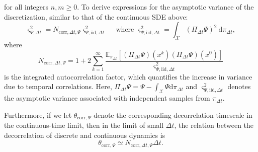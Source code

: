\documentclass[11pt, twoside]{report}
\newtheorem{assumption}[theorem]{Assumption}
\begin{document}
for all integers $n,m \geq 0$. To derive expressions for the asymptotic variance of the discretization, similar to that of the continuous SDE above:
\begin{equation}
\varsigma_{\Psi, \Delta t}^2=N_{\mathrm{corr}, \Delta t, \Psi} \varsigma_{\Psi, \mathrm{iid}, \Delta t}^2 \quad \text { where } \varsigma_{\Psi, \mathrm{iid}, \Delta t}^2=\int_{\mathcal{X}}\left(\Pi_{\Delta t} \Psi\right)^2 \mathrm{~d} \pi_{\Delta t},
\end{equation}
where
\[
N_{\mathrm{corr},\Delta t,\Psi}
=
1+2\sum_{k=1}^{\infty}
\frac{
\mathbb E_{\pi_{\Delta t}}
\!\left[
(\Pi_{\Delta t}\Psi)(x^k)
(\Pi_{\Delta t}\Psi)(x^0)
\right]
}{
\varsigma_{\Psi,\mathrm{iid},\Delta t}^{2}
}
\]
is the integrated autocorrelation factor, which quantifies the increase in variance due to temporal correlations. Here, $\Pi_{\Delta t} \Psi=\Psi-\int_{\mathcal{X}} \Psi \mathrm{d} \pi_{\Delta t}$ and $\varsigma_{\Psi,\mathrm{iid},\Delta t}^{2}$ denotes the asymptotic variance associated with independent samples from $\pi_{\Delta t}$.

Furthermore, if we let $\theta_{\mathrm{corr},\Psi}$ denote the corresponding decorrelation timescale in the continuous-time limit, then in the limit of small $\Delta t$, the relation between the decorrelation of discrete and continuous dynamics is
$$\theta_{\mathrm{corr}, \Psi} \simeq N_{\mathrm{corr}, \Delta t, \Psi} \Delta t.$$

\end{document}
